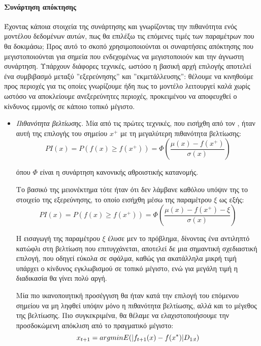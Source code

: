  	\paragraph{Συνάρτηση απόκτησης} Έχοντας κάποια στοιχεία της συνάρτησης και γνωρίζοντας την πιθανότητα ενός μοντέλου δεδομένων αυτών, πως θα επιλέξω τις επόμενες τιμές των παραμέτρων που θα δοκιμάσω; Προς αυτό το σκοπό χρησιμοποιούνται οι συναρτήσεις απόκτησης που μεγιστοποιούνται για σημεία που
 	ενδεχομένως να μεγιστοποιούν και την άγνωστη συνάρτηση. Υπάρχουν διάφορες τεχνικές, ωστόσο η βασική αρχή επιλογής αποτελεί ένα συμβιβασμό μεταξύ ''εξερεύνησης'' και ''εκμετάλλευσης'': θέλουμε να κινηθούμε προς περιοχές για τις οποίες γνωρίζουμε ήδη πως το μοντέλο λειτουργεί καλά χωρίς ωστόσο να αποκλείουμε ανεξερεύνητες περιοχές, προκειμένου να αποφευχθεί ο κίνδυνος εμμονής σε κάποιο τοπικό μέγιστο.
 	\begin{itemize}
 		\item \textit{Πιθανότητα βελτίωσης.} Μία από τις πρώτες τεχνικές, που εισήχθη από τον \citet{Kushner}, ήταν αυτή της επιλογής του σημείου $x^+$ με τη μεγαλύτερη πιθανότητα βελτίωσης:
 		$$PI(x)= P(f(x) \geq f(x^+)) = \Phi (\frac{\mu(x) - f(x^+)}{\sigma(x)})$$
 		
 		όπου $\Phi$ είναι η συνάρτηση κανονικής αθροιστικής κατανομής.
 		
 		Το βασικό της μειονέκτημα τότε ήταν ότι δεν λάμβανε καθόλου υπόψιν της το στοιχείο της εξερεύνησης, το οποίο εισήχθη μέσω της παραμέτρου $\xi$ ως εξής:
 		$$PI(x)= P(f(x) \geq f(x^+)) = \Phi (\frac{\mu(x) - f(x^+) - \xi}{\sigma(x)})$$
 		
 		Η εισαγωγή της παραμέτρου $\xi$ έλυσε μεν το πρόβλημα, δίνοντας ένα αντιληπτό κατώφλι στη βελτίωση που επιτυγχάνεται, αποτελεί δε μια σημαντική σχεδιαστική επιλογή, που οδηγεί εύκολα σε σφάλμα, καθώς για ακατάλληλα μικρή τιμή υπάρχει ο κίνδυνος εγκλωβισμού σε τοπικό μέγιστο, ενώ για μεγάλη τιμή η διαδικασία θα γίνει πολύ αργή.
 		
 		Μία πιο ικανοποιητική προσέγγιση θα ήταν κατά την επιλογή του επόμενου σημείου να μη ληφθεί υπόψιν μόνο η πιθανότητα βελτίωσης, αλλά και το μέγεθος της βελτίωσης. Πιο συγκεκριμένα, θα θέλαμε να ελαχιστοποιήσουμε την προσδοκώμενη απόκλιση από το πραγματικό μέγιστο:
 		$$x_{t+1}= argmin E(\lvert f_{t+1}(x) -f(x^*)\rvert D_{1:t})$$
 		

\end{itemize}
